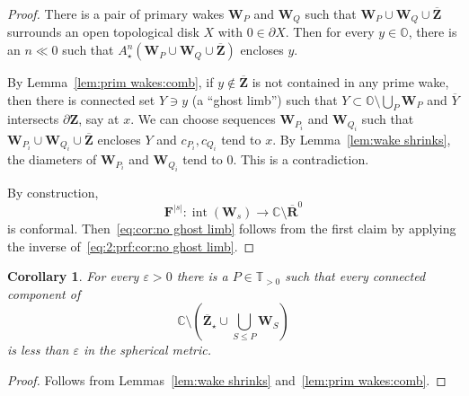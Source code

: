 \documentclass{amsart}
\newcommand{\1}{{\mathbb 1 }}
\newcommand\PT{\mathbb{ T}}
\newcommand{\bO}{{\mathbb{O}}}
\newcommand\intr{\operatorname{int}}
\newcommand{\bF}{{\mathbf F}}
\newcommand{\bZ}{{\mathbf Z}}
\newcommand{\bW}{{\mathbf W}}
\newcommand{\bR}{{\mathbf R}}
\newcommand{\str}{{\star}}
\newcommand{\C}{\mathbb{C}}
\newtheorem{cor}[thm]{Corollary}
\theoremstyle{remark}
\numberwithin{equation}{section}
\theoremstyle{definition}
\theoremstyle{nonumberbreak}
\begin{document}
\begin{proof}
There is a pair of primary wakes $\bW_P$ and $\bW_Q$ such that $\bW_P\cup \bW_Q\cup \overline \bZ$ surrounds an open topological disk $X$ with $0\in \partial X$. Then for every $y\in \bO$, there is an $n\ll 0$ such that $A^n_\str\left(\bW_P\cup \bW_Q\cup \overline \bZ\right)$ encloses $y$. 

By Lemma~\ref{lem:prim wakes:comb}, if $y\not\in \overline \bZ$ is not contained in any prime wake, then there is connected set $Y\ni y$ (a ``ghost limb'') such that $Y\subset \bO\setminus \displaystyle\bigcup_P \bW_P$ and $\overline Y$ intersects $\partial \bZ$, say at $x$. We can choose sequences $\bW_{P_i}$ and $\bW_{Q_i}$ such that $\bW_{P_i}\cup \bW_{Q_i}\cup \overline \bZ$ encloses $Y$ and $c_{P_i},c_{Q_i}$ tend to $x$. By Lemma~\ref{lem:wake shrinks}, the diameters of $\bW_{P_i}$ and $\bW_{Q_i}$ tend to $0$. This is a contradiction.

By construction, 
\begin{equation}
\label{eq:2:prf:cor:no ghost limb}
\bF^{|s|}\colon \intr(\bW_s)\to \C\setminus \overline \bR^0
\end{equation}
is conformal. Then~\eqref{eq:cor:no ghost limb} follows from the first claim by applying the inverse of~\eqref{eq:2:prf:cor:no ghost limb}.
\end{proof}

\begin{cor}
\label{cor:wakes are close to bJ}
For every $\varepsilon>0$ there is a $P\in \PT_{>0}$ such that every connected component of 
\begin{equation}
\label{eq:gaps between bW:bFstr}
\C\setminus\left(\overline \bZ_\str \cup \bigcup_{S\le P} \bW_S\right) 
\end{equation}
is less than $\varepsilon$ in the spherical metric.
\end{cor}
\begin{proof}
Follows from Lemmas~\ref{lem:wake shrinks} and~\ref{lem:prim wakes:comb}. 
\end{proof}
\end{document}
